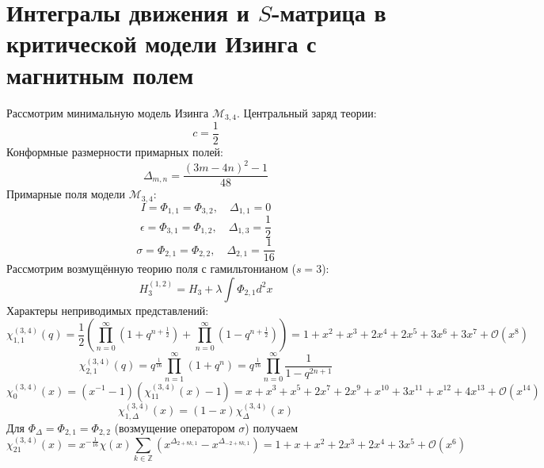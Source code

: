 \documentclass[12pt]{article}
\theoremstyle{definition}
\begin{document}
\section{Интегралы движения и $S$-матрица в критической модели Изинга с магнитным полем}
Рассмотрим минимальную модель Изинга $\mathcal{M}_{3,4}$. Центральный заряд теории:
\begin{equation}
    c=\frac{1}{2}
\end{equation}
Конформные размерности примарных полей:
\begin{equation}
    \Delta_{m,n}=\frac{(3m-4n)^2-1}{48}
\end{equation}
Примарные поля модели $\mathcal{M}_{3,4}$:
\begin{equation}
    I=\Phi_{1,1}=\Phi_{3,2},\quad \Delta_{1,1}=0
\end{equation}
\begin{equation}
    \epsilon=\Phi_{3,1}=\Phi_{1,2},\quad \Delta_{1,3}=\frac{1}{2}
\end{equation}
\begin{equation}
    \sigma=\Phi_{2,1}=\Phi_{2,2},\quad\Delta_{2,1}=\frac{1}{16}
\end{equation}
Рассмотрим возмущённую теорию поля с гамильтонианом ($s=3$):
\begin{equation}
    H^{(1,2)}_3=H_3+\lambda\int\Phi_{2,1}d^2x
\end{equation}
Характеры неприводимых представлений:
\begin{equation}
    \chi^{(3,4)}_{1,1}(q)=\frac{1}{2}\left(\prod\limits_{n=0}^\infty(1+q^{n+\frac{1}{2}})+\prod\limits_{n=0}^\infty(1-q^{n+\frac{1}{2}})\right)=1+x^2+x^3+2x^4+2x^5+3x^6+3x^7+\mathcal{O}(x^8)
\end{equation}
\begin{equation}
    \chi^{(3,4)}_{2,1}(q)=q^{\frac{1}{16}}\prod\limits_{n=1}^\infty(1+q^n)=q^{\frac{1}{16}}\prod\limits_{n=0}^\infty\frac{1}{1-q^{2n+1}}
\end{equation}
\begin{equation}
    \chi^{(3,4)}_0(x)=(x^{-1}-1)(\chi^{(3,4)}_{11}(x)-1)=x+x^3+x^5+2x^7+2x^9+x^{10}+3x^{11}+x^{12}+4x^{13}+\mathcal{O}(x^{14})
\end{equation}
\begin{equation}
    \chi^{(3,4)}_{1,\Delta}(x)=(1-x)\chi^{(3,4)}_\Delta(x)
\end{equation}
Для $\Phi_\Delta =\Phi_{2,1}=\Phi_{2,2}$ (возмущение оператором $\sigma$) получаем
\begin{equation}
    \chi^{(3,4)}_{21}(x)=x^{-\frac{1}{16}}\chi(x)\sum\limits_{k\in\mathbb{Z}}(x^{\Delta_{2+8k,1}}-x^{\Delta_{-2+8k,1}})=1+x+x^2+2x^3+2x^4+3x^5+\mathcal{O}(x^6)
\end{equation}
\end{document}
